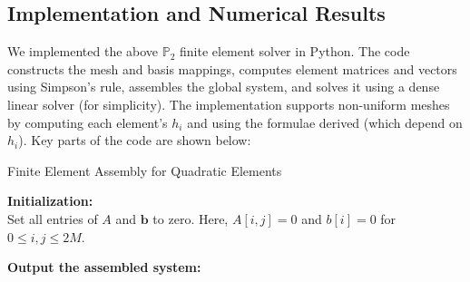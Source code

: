 \documentclass[a4paper,10pt]{article}
\begin{document}
\subsection{Implementation and Numerical Results}

We implemented the above \(\mathbb{P}_2 \) finite element solver in Python.
The code constructs the mesh and basis mappings, computes element matrices and vectors using Simpson's rule, assembles the global system, and solves it using a dense linear solver (for simplicity).
The implementation supports non-uniform meshes by computing each element’s \(h_i\) and using the formulae derived (which depend on \(h_i\)).
Key parts of the code are shown below:


\begin{algorithm}[H]
	\caption{Finite Element Assembly for Quadratic Elements}
	\label{alg:FEM_assembly}


	\BlankLine

	\textbf{Initialization:}\\
	Set all entries of \(A\) and \(\mathbf{b}\) to zero.
	Here, \(A[i,j] = 0\) and \(b[i] = 0\) for \(0 \le i,j \le 2M\).\;

	\BlankLine
	\BlankLine

	\textbf{Output the assembled system:}\\

\end{algorithm}
\end{document}
